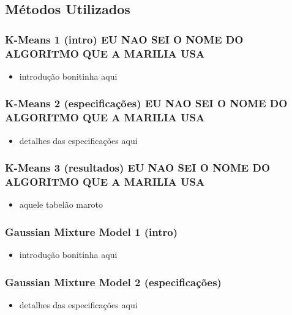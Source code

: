 \documentclass{beamer}
\begin{document}
\subsection{Métodos Utilizados}

\begin{frame}

	\frametitle{K-Means 1 (intro) \textbf{EU NAO SEI O NOME DO ALGORITMO QUE A MARILIA USA}}
	
	\begin{itemize}	
		\item introdução bonitinha aqui
	\end{itemize}
	
\end{frame}


\begin{frame}

	\frametitle{K-Means 2 (especificações) \textbf{EU NAO SEI O NOME DO ALGORITMO QUE A MARILIA USA}}
	
	\begin{itemize}	
		\item detalhes das especificações aqui
	\end{itemize}
	
\end{frame}


\begin{frame}

	\frametitle{K-Means 3 (resultados) \textbf{EU NAO SEI O NOME DO ALGORITMO QUE A MARILIA USA}}
	
	\begin{itemize}	
		\item aquele tabelão maroto
	\end{itemize}
	
\end{frame}


\begin{frame}

	\frametitle{Gaussian Mixture Model 1 (intro)}
	
	\begin{itemize}	
		\item introdução bonitinha aqui
	\end{itemize}
	
\end{frame}


\begin{frame}

	\frametitle{Gaussian Mixture Model 2 (especificações)}
	
	\begin{itemize}	
		\item detalhes das especificações aqui
	\end{itemize}
	
\end{frame}
\end{document}
